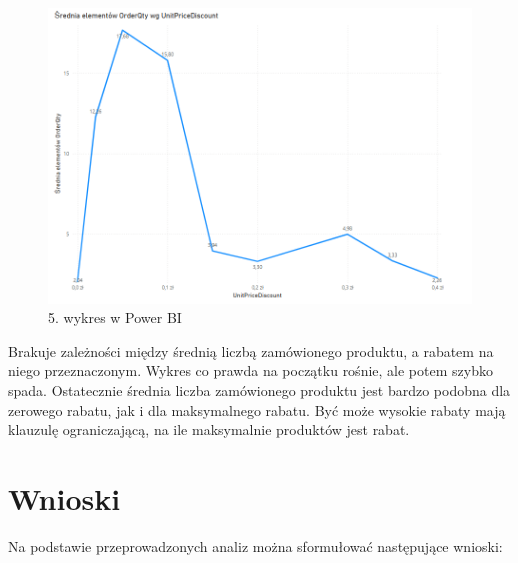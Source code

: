 \documentclass[a4paper,12pt]{article}
\begin{document}
\begin{figure}[H]
    \centering
    \includegraphics[width=1.0\textwidth]{images/power_bi/05.png}
    \caption{5. wykres w Power BI}
\end{figure}

Brakuje zależności między średnią liczbą zamówionego produktu, a rabatem na niego przeznaczonym. Wykres co prawda na początku rośnie, ale potem szybko spada. Ostatecznie średnia liczba zamówionego produktu jest bardzo podobna dla zerowego rabatu, jak i dla maksymalnego rabatu. Być może wysokie rabaty mają klauzulę ograniczającą, na ile maksymalnie produktów jest rabat.

\section{Wnioski}

Na podstawie przeprowadzonych analiz można sformułować następujące wnioski:
\end{document}
